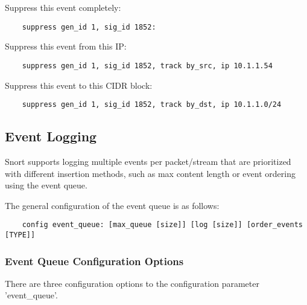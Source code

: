 \documentclass[english]{report}
\begin{document}
Suppress this event completely:

\begin{verbatim}
    suppress gen_id 1, sig_id 1852:
\end{verbatim}

Suppress this event from this IP:

\begin{verbatim}
    suppress gen_id 1, sig_id 1852, track by_src, ip 10.1.1.54
\end{verbatim}

Suppress this event to this CIDR block:

\begin{verbatim}
    suppress gen_id 1, sig_id 1852, track by_dst, ip 10.1.1.0/24
\end{verbatim}

\subsection{Event Logging}
\label{eventqueue}

Snort supports logging multiple events per packet/stream that are prioritized
with different insertion methods, such as max content length or event ordering
using the event queue.

The general configuration of the event queue is as follows:

\begin{verbatim}
    config event_queue: [max_queue [size]] [log [size]] [order_events [TYPE]]
\end{verbatim}

\subsubsection{Event Queue Configuration Options}

There are three configuration options to the configuration parameter
'event\_queue'.
\end{document}
